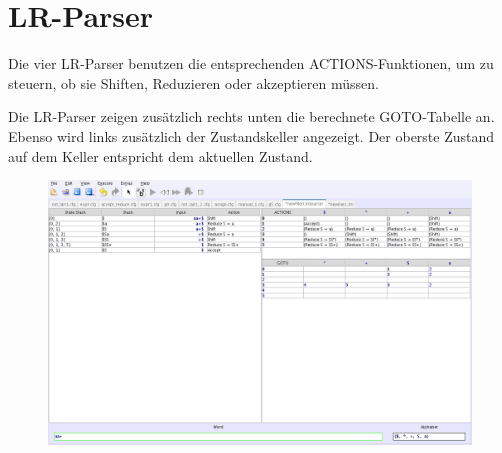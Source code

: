 \section{LR-Parser}

Die vier LR-Parser benutzen die entsprechenden ACTIONS-Funktionen,
um zu steuern, ob sie Shiften, Reduzieren oder akzeptieren müssen.

Die LR-Parser zeigen zusätzlich rechts unten die berechnete GOTO-Tabelle an.
Ebenso wird links zusätzlich der Zustandskeller angezeigt. Der oberste
Zustand auf dem Keller entspricht dem aktuellen Zustand.

\begin{figure}[h]
\begin{center}
\includegraphics[width=12cm]{../images/lr.png}
\end{center}
\end{figure}
